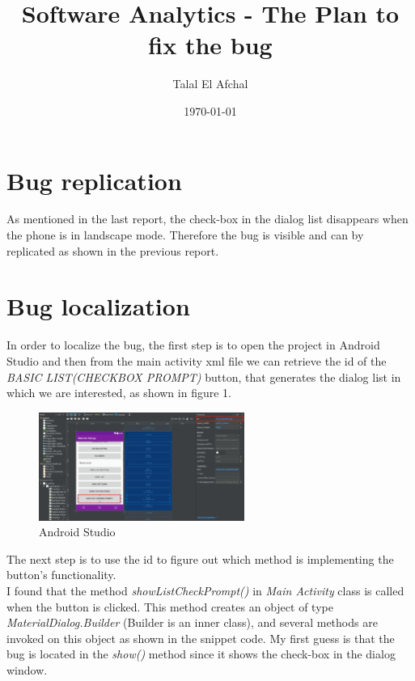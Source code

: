\documentclass[12pt]{report}
\begin{document}
\title{Software Analytics - The Plan to fix the bug}
\author{Talal El Afchal}
\date{\today}
\maketitle

\section*{Bug replication}
	As mentioned in the last report, the check-box in the dialog list disappears when the phone is in landscape mode. Therefore the bug is visible and can by replicated as shown in the previous report.


\section*{Bug localization}
	In order to localize the bug, the first step is to open the project in Android Studio and then from the main activity xml file we can retrieve the id of the \emph{BASIC LIST(CHECKBOX PROMPT)} button, that generates the dialog list in which we are interested, as shown in figure 1.
\begin{figure}[H]
	\centering
	\includegraphics[width=0.6\textwidth]{screenshots/id.png}
	\caption{Android Studio}
\end{figure}
\noindent
	The next step is to use the id to figure out which method is implementing the button's functionality.\\ 
	I found that the method \emph{showListCheckPrompt()} in \emph{Main Activity} class is called when the button is clicked. This method creates an object of type \emph{MaterialDialog.Builder} (Builder is an inner class), and several methods are invoked on this object as shown in the snippet code. My first guess is that the bug is located in the \emph{show()} method since it shows the check-box in the dialog window.
\end{document}
